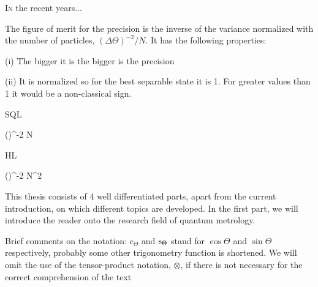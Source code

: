 \lettrine[lines=2, findent=3pt,nindent=0pt]{I}{n} the recent years...

The figure of merit for the precision is the inverse of the variance normalized with the number of particles, $(\Delta \Theta)^{-2}/N$. It has the following properties:

(i) The bigger it is the bigger is the precision

(ii) It is normalized so for the best separable state it is 1.
For greater values than 1 it would be a non-classical sign.

SQL

\be
  (\Delta \Theta)^{-2} \le N
\ee

HL

\be
  (\Delta \Theta)^{-2} \le N^2
\ee

This thesis consists of 4 well differentiated parts, apart from the current introduction, on which different topics are developed.
In the first part, we will introduce the reader onto the research field of quantum metrology.

Brief comments on the notation: $\text{c}_{\Theta}$ and ${\rm s}_{\Theta}$ stand for $\cos\Theta$ and $\sin\Theta$ respectively, probably some other trigonometry function is shortened.
We will omit the use of the tensor-product notation, $\otimes$, if there is not necessary for the correct comprehension of the text
